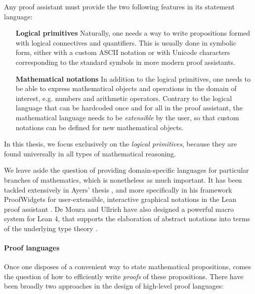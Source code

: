 Any proof assistant must provide the two following features in its statement
language:

\begin{itemize}
  \item[\textbf{Logical primitives}] Naturally, one needs a way to write
  propositions formed with logical connectives and quantifiers. This is usually
  done in symbolic form, either with a custom ASCII notation or with Unicode
  characters corresponding to the standard symbols in more modern proof
  assistants. 
  \item[\textbf{Mathematical notations}] In addition to the logical primitives,
  one needs to be able to express mathematical objects and operations in the
  domain of interest, e.g. numbers and arithmetic operators. Contrary to the
  logical language that can be hardcoded once and for all in the proof
  assistant, the mathematical language needs to be \emph{extensible} by the
  user, so that custom notations can be defined for new mathematical objects.
\end{itemize}

\begin{emphpar}
  In this thesis, we focus exclusively on the \emph{logical primitives}, because
  they are found universally in all types of mathematical reasoning. 
\end{emphpar}

We leave aside the question of providing domain-specific languages for
particular branches of mathematics, which is nonetheless as much important. It
has been tackled extensively in Ayers' thesis , and more
specifically in his framework ProofWidgets for user-extensible, interactive
graphical notations in the Lean proof assistant . De Moura and Ullrich
have also designed a powerful macro system for Lean 4, that supports the
elaboration of abstract notations into terms of the underlying type theory
.

\paragraph{Proof languages}

Once one disposes of a convenient way to state mathematical propositions, comes
the question of how to efficiently write \emph{proofs} of these propositions.
There have been broadly two approaches in the design of high-level proof
languages:

